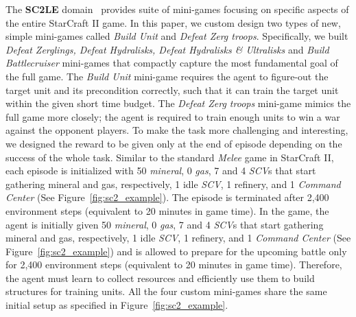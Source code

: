 \documentclass{article} \usepackage{iclr2020_conference,times}
\newcommand{\tb}{\textbf}
\begin{document}
The \tb{SC2LE} domain~\citep{vinyals2017starcraft} provides suite of mini-games focusing on specific aspects
of the entire StarCraft II game.
In this paper, we custom design two types of new, simple mini-games called \textit{Build Unit} and \textit{Defeat Zerg troops}. Specifically, we built \textit{Defeat Zerglings, Defeat Hydralisks, Defeat Hydralisks \& Ultralisks} and \textit{Build Battlecruiser} mini-games that compactly capture the most fundamental goal of the full game. 
The \textit{Build Unit} mini-game requires the agent to figure-out the target unit and its precondition correctly, such that it can train the target unit within the given short time budget. The \textit{Defeat Zerg troops} mini-game mimics the full game more closely; the agent is required to train enough units to win a war against the opponent players. To make the task more challenging and interesting, we designed the reward to be given only at the end of episode depending on the success of the whole task.
Similar to the standard \emph{Melee} game in StarCraft II, each episode is initialized with 50 \textit{mineral}, 0 \textit{gas}, 7 and 4 \textit{SCV}s that start gathering mineral and gas, respectively, 1 idle \textit{SCV}, 1 refinery, and 1 \textit{Command Center} (See Figure~\ref{fig:sc2_example}).   The episode is terminated after 2,400 environment steps (equivalent to 20 minutes in game time).
In the game, the agent is initially given 50 \textit{mineral}, 0 \textit{gas}, 7 and 4 \textit{SCV}s that start gathering mineral and gas, respectively, 1 idle \textit{SCV}, 1 refinery, and 1 \textit{Command Center} (See Figure~\ref{fig:sc2_example}) and is allowed
to prepare for the upcoming battle only for 2,400 environment steps (equivalent to 20 minutes in game time).
Therefore, the agent must learn to collect resources and efficiently use them to build structures for training units.
All the four custom mini-games share the same initial setup as specified in Figure~\ref{fig:sc2_example}.
\end{document}
